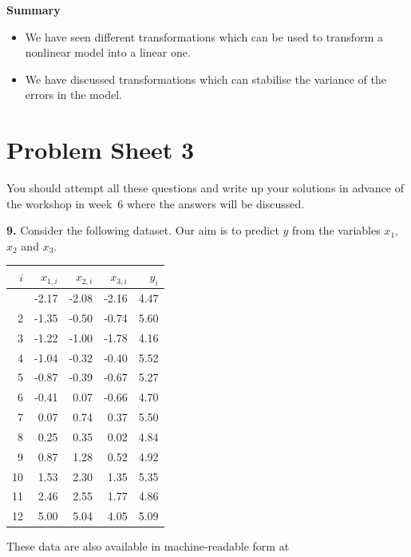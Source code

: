 \documentclass[
  a4paper,
]{article}
\providecommand{\tightlist}{%
  \setlength{\itemsep}{0pt}\setlength{\parskip}{0pt}}
\theoremstyle{definition}
\theoremstyle{definition}
\theoremstyle{definition}
\theoremstyle{definition}
\theoremstyle{remark}
\begin{document}
\textbf{Summary}

\begin{itemize}
\tightlist
\item
  We have seen different transformations which can be used
  to transform a nonlinear model into a linear one.
\item
  We have discussed transformations which can stabilise the
  variance of the errors in the model.
\end{itemize}

\clearpage

\section*{Problem Sheet 3}\label{P03}


You should attempt all these questions and write up your solutions in advance
of the workshop in week~6 where the answers will be discussed.

\textbf{9.} Consider the following dataset. Our aim is to predict \(y\) from the
variables \(x_1\), \(x_2\) and \(x_3\).

{\def\LTcaptype{} %
\begin{longtable}[]{@{}rrrrr@{}}
\toprule\noalign{}
\(i\) & \(x_{1,i}\) & \(x_{2,i}\) & \(x_{3,i}\) & \(y_i\) \\
\midrule\noalign{}
\endhead
\bottomrule\noalign{}
\endlastfoot
1 & -2.17 & -2.08 & -2.16 & 4.47 \\
2 & -1.35 & -0.50 & -0.74 & 5.60 \\
3 & -1.22 & -1.00 & -1.78 & 4.16 \\
4 & -1.04 & -0.32 & -0.40 & 5.52 \\
5 & -0.87 & -0.39 & -0.67 & 5.27 \\
6 & -0.41 & 0.07 & -0.66 & 4.70 \\
7 & 0.07 & 0.74 & 0.37 & 5.50 \\
8 & 0.25 & 0.35 & 0.02 & 4.84 \\
9 & 0.87 & 1.28 & 0.52 & 4.92 \\
10 & 1.53 & 2.30 & 1.35 & 5.35 \\
11 & 2.46 & 2.55 & 1.77 & 4.86 \\
12 & 5.00 & 5.04 & 4.05 & 5.09 \\
\end{longtable}
}

These data are also available in machine-readable form at
\end{document}

